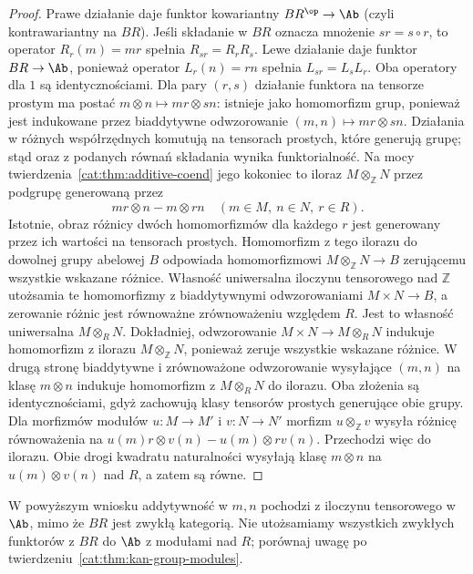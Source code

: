 \begin{proof}
Prawe działanie daje funktor kowariantny $BR^{\op}\to\Ab$ (czyli kontrawariantny na $BR$). Jeśli składanie w $BR$ oznacza mnożenie $sr=s\circ r$, to operator $R_r(m)=mr$ spełnia $R_{sr}=R_r R_s$. Lewe działanie daje funktor $BR\to\Ab$, ponieważ operator $L_r(n)=rn$ spełnia $L_{sr}=L_s L_r$. Oba operatory dla $1$ są identycznościami. Dla pary $(r,s)$ działanie funktora na tensorze prostym ma postać $m\otimes n\mapsto mr\otimes sn$: istnieje jako homomorfizm grup, ponieważ jest indukowane przez biaddytywne odwzorowanie $(m,n)\mapsto mr\otimes sn$. Działania w różnych współrzędnych komutują na tensorach prostych, które generują grupę; stąd oraz z podanych równań składania wynika funktorialność. Na mocy twierdzenia~\ref{cat:thm:additive-coend} jego kokoniec to iloraz $M\otimes_{\mathbb Z}N$ przez podgrupę generowaną przez
\[
 mr\otimes n-m\otimes rn \quad(m\in M,\ n\in N,\ r\in R).
\]
Istotnie, obraz różnicy dwóch homomorfizmów dla każdego $r$ jest generowany przez ich wartości na tensorach prostych. Homomorfizm z tego ilorazu do dowolnej grupy abelowej $B$ odpowiada homomorfizmowi $M\otimes_{\mathbb Z}N\to B$ zerującemu wszystkie wskazane różnice. Własność uniwersalna iloczynu tensorowego nad $\mathbb Z$ utożsamia te homomorfizmy z biaddytywnymi odwzorowaniami $M\times N\to B$, a zerowanie różnic jest równoważne zrównoważeniu względem $R$. Jest to własność uniwersalna $M\otimes_R N$. Dokładniej, odwzorowanie $M\times N\to M\otimes_R N$ indukuje homomorfizm z ilorazu $M\otimes_{\mathbb Z}N$, ponieważ zeruje wszystkie wskazane różnice. W drugą stronę biaddytywne i zrównoważone odwzorowanie wysyłające $(m,n)$ na klasę $m\otimes n$ indukuje homomorfizm z $M\otimes_R N$ do ilorazu. Oba złożenia są identycznościami, gdyż zachowują klasy tensorów prostych generujące obie grupy. Dla morfizmów modułów $u:M\to M'$ i $v:N\to N'$ morfizm $u\otimes_{\mathbb Z}v$ wysyła różnicę równoważenia na $u(m)r\otimes v(n)-u(m)\otimes rv(n)$. Przechodzi więc do ilorazu. Obie drogi kwadratu naturalności wysyłają klasę $m\otimes n$ na $u(m)\otimes v(n)$ nad $R$, a zatem są równe.
\end{proof}
\begin{uwaga}
W powyższym wniosku addytywność w $m,n$ pochodzi z iloczynu tensorowego w $\Ab$, mimo że $BR$ jest zwykłą kategorią. Nie utożsamiamy wszystkich zwykłych funktorów z $BR$ do $\Ab$ z modułami nad $R$; porównaj uwagę po twierdzeniu~\ref{cat:thm:kan-group-modules}.
\end{uwaga}

